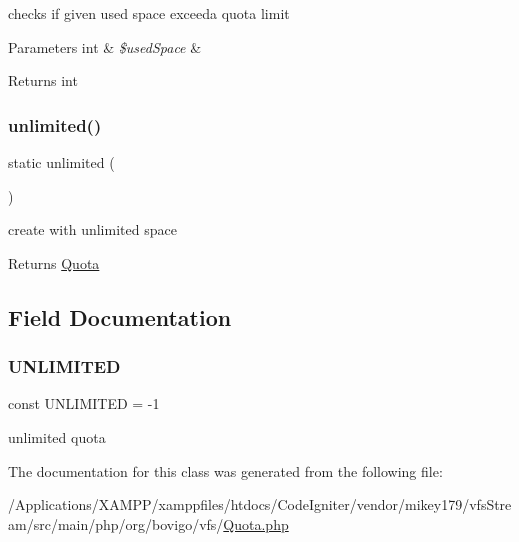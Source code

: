 checks if given used space exceeda quota limit


\begin{DoxyParams}[1]{Parameters}
int & {\em \$used\+Space} & \\
\hline
\end{DoxyParams}
\begin{DoxyReturn}{Returns}
int 
\end{DoxyReturn}
\mbox{\label{classorg_1_1bovigo_1_1vfs_1_1_quota_a1873bf81690fdbb3ca0eaf7faa08450a}} 
\subsubsection{\texorpdfstring{unlimited()}{unlimited()}}
{\footnotesize\ttfamily static unlimited (\begin{DoxyParamCaption}{ }\end{DoxyParamCaption})\hspace{0.3cm}{\ttfamily [static]}}

create with unlimited space

\begin{DoxyReturn}{Returns}
\mbox{\hyperlink{classorg_1_1bovigo_1_1vfs_1_1_quota}{Quota}} 
\end{DoxyReturn}


\subsection{Field Documentation}
\mbox{\label{classorg_1_1bovigo_1_1vfs_1_1_quota_af1c43c06d3e15c94050ef7e233971357}} 
\subsubsection{\texorpdfstring{U\+N\+L\+I\+M\+I\+T\+ED}{UNLIMITED}}
{\footnotesize\ttfamily const U\+N\+L\+I\+M\+I\+T\+ED = -\/1}

unlimited quota 

The documentation for this class was generated from the following file\+:\begin{DoxyCompactItemize}
\item 
/\+Applications/\+X\+A\+M\+P\+P/xamppfiles/htdocs/\+Code\+Igniter/vendor/mikey179/vfs\+Stream/src/main/php/org/bovigo/vfs/\mbox{\hyperlink{_quota_8php}{Quota.\+php}}\end{DoxyCompactItemize}
